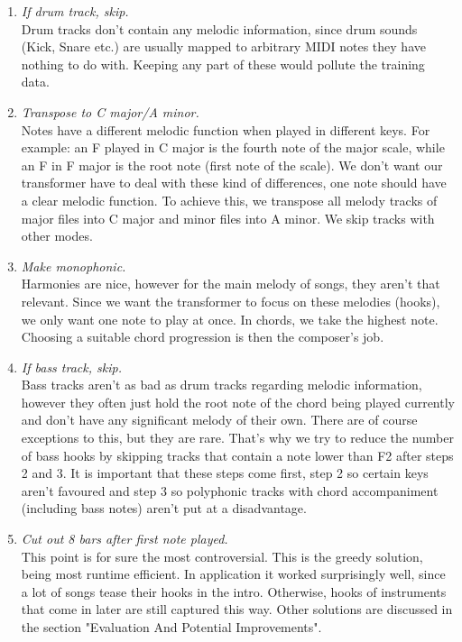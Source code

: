 \documentclass[a4paper,12pt]{extarticle}
\begin{document}
\begin{enumerate}
    \item \textit{If drum track, skip.} \\[0.2cm]
    Drum tracks don't contain any melodic information, since drum sounds (Kick, Snare etc.) are usually mapped to arbitrary MIDI notes they have nothing to do with. Keeping any part of these would pollute the training data.
    
    \item \textit{Transpose to C major/A minor.} \\[0.2cm]
    Notes have a different melodic function when played in different keys. For example: an F played in C major is the fourth note of the major scale, while an F in F major is the root note (first note of the scale). We don't want our transformer have to deal with these kind of differences, one note should have a clear melodic function. To achieve this, we transpose all melody tracks of major files into C major and minor files into A minor. We skip tracks with other modes.
    \item \textit{Make monophonic.} \\[0.2cm]
    Harmonies are nice, however for the main melody of songs, they aren't that relevant. Since we want the transformer to focus on these melodies (hooks), we only want one note to play at once. In chords, we take the highest note. Choosing a suitable chord progression is then the composer's job.
    \item \textit{If bass track, skip.} \\[0.2cm]
    Bass tracks aren't as bad as drum tracks regarding melodic information, however they often just hold the root note of the chord being played currently and don't have any significant melody of their own. There are of course exceptions to this, but they are rare. That's why we try to reduce the number of bass hooks by skipping tracks that contain a note lower than F2 after steps 2 and 3. It is important that these steps come first, step 2 so certain keys aren't favoured and step 3 so polyphonic tracks with chord accompaniment (including bass notes) aren't put at a disadvantage.
    \item \textit{Cut out 8 bars after first note played.} \\[0.2cm]
    This point is for sure the most controversial. This is the greedy solution, being most runtime efficient. In application it worked surprisingly well, since a lot of songs tease their hooks in the intro. Otherwise, hooks of instruments that come in later are still captured this way. Other solutions are discussed in the section "Evaluation And Potential Improvements".

\end{enumerate}
\end{document}
